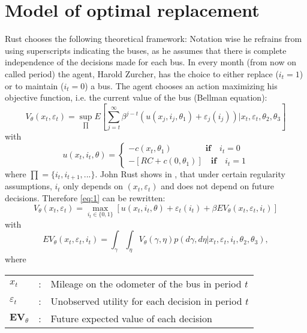 \documentclass[a4paper,12pt,bold]{scrartcl}
\begin{document}
\section{Model of optimal replacement}
Rust chooses the following theoretical framework: Notation wise he refrains from using superscripts indicating the buses, as he assumes that there is complete independence of the decisions made for each bus. In every month (from now on called period) the agent, Harold Zurcher, has the choice to either replace (\(i_t = 1 \)) or to maintain (\(i_t = 0\)) a bus. The agent chooses an action maximizing his objective function, i.e. the current value of the bus (Bellman equation):
\begin{equation} \label{eq:1}
  V_{\theta}(x_t, \varepsilon_t) = \sup_{\prod} E [\sum_{j=t}^{\infty} \beta^{j-t} (u(x_j, i_j, \theta_1) + \varepsilon_j(i_j))| x_t, \varepsilon_t, \theta_2, \theta_3]
\end{equation}
with
\begin{equation}
  u(x_t,i_t, \theta)=
  \begin{cases}
  -c(x_t, \theta_1)\qquad \qquad  \textbf{if} \quad i_t=0 \\
  -[RC + c(0, \theta_1)]\quad \textbf{if} \quad i_t=1
  \end{cases}
\end{equation}
where $\prod = \{i_t, i_{t+1}, ...\}$. John Rust shows in \cite{Rust.1988}, that under certain regularity assumptions, $i_t$ only depends on $(x_t, \varepsilon_t)$ and does not depend on future decisions. Therefore \ref{eq:1} can be rewritten:
  \begin{equation} \label{eq:2}
    V_{\theta}(x_t, \varepsilon_t) = \max_{i_t \in \{0, 1\}} [ u(x_t, i_t, \theta) + \varepsilon_t (i_t) + \beta EV_{ \theta }( x_t, \varepsilon_t, i_t) ]
  \end{equation}
with
\begin{equation}
  EV_{\theta}(x_t, \varepsilon_t, i_t) = \int_{\gamma}\int_{\eta} V_{\theta}(\gamma, \eta)p(d\gamma, d\eta | x_t, \varepsilon_t, i_t, \theta_2, \theta_3),
\end{equation}
  \bigskip
where \\
\begin{table}[htbp]
    \centering %
    \begin{tabular}{l c p{10cm} }
        $x_t$ & : & Mileage on the odometer of the bus in period $t$\\
        $\varepsilon_t$ & : & Unobserved utility for each decision in period $t$\\
        $\mathbf{EV}_{\theta}$ & : & Future expected value of each decision\\
    \end{tabular}
\end{table}
\end{document}
